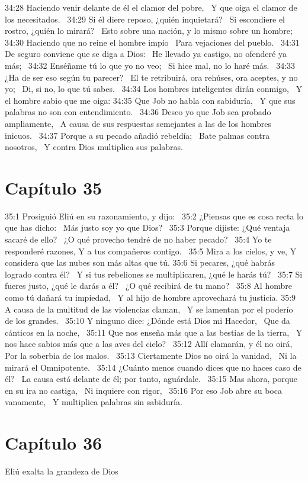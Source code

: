 34:28 Haciendo venir delante de él el clamor del pobre,  
Y que oiga el clamor de los necesitados.  
34:29 Si él diere reposo, ¿quién inquietará?  
Si escondiere el rostro, ¿quién lo mirará?  
Esto sobre una nación, y lo mismo sobre un hombre;  
34:30 Haciendo que no reine el hombre impío  
Para vejaciones del pueblo.  
34:31 De seguro conviene que se diga a Dios:  
He llevado ya castigo, no ofenderé ya más;  
34:32 Enséñame tú lo que yo no veo;  
Si hice mal, no lo haré más.  
34:33 ¿Ha de ser eso según tu parecer?  
El te retribuirá, ora rehúses, ora aceptes, y no yo;  
Di, si no, lo que tú sabes.  
34:34 Los hombres inteligentes dirán conmigo,  
Y el hombre sabio que me oiga: 
34:35 Que Job no habla con sabiduría,  
Y que sus palabras no son con entendimiento.  
34:36 Deseo yo que Job sea probado ampliamente,  
A causa de sus respuestas semejantes a las de los hombres inicuos.  
34:37 Porque a su pecado añadió rebeldía;  
Bate palmas contra nosotros,  
Y contra Dios multiplica sus palabras.  
\section*{Capítulo 35 }

35:1 Prosiguió Eliú en su razonamiento, y dijo:  
35:2 ¿Piensas que es cosa recta lo que has dicho:  
Más justo soy yo que Dios?  
35:3 Porque dijiste: ¿Qué ventaja sacaré de ello?  
¿O qué provecho tendré de no haber pecado?  
35:4 Yo te responderé razones, 
Y a tus compañeros contigo.  
35:5 Mira a los cielos, y ve, 
Y considera que las nubes son más altas que tú. 
35:6 Si pecares, ¿qué habrás logrado contra él?  
Y si tus rebeliones se multiplicaren, ¿qué le harás tú?  
35:7 Si fueres justo, ¿qué le darás a él?  
¿O qué recibirá de tu mano?  
35:8 Al hombre como tú dañará tu impiedad,  
Y al hijo de hombre aprovechará tu justicia. 
35:9 A causa de la multitud de las violencias claman,  
Y se lamentan por el poderío de los grandes.  
35:10 Y ninguno dice: ¿Dónde está Dios mi Hacedor,  
Que da cánticos en la noche,  
35:11 Que nos enseña más que a las bestias de la tierra,  
Y nos hace sabios más que a las aves del cielo?  
35:12 Allí clamarán, y él no oirá,  
Por la soberbia de los malos.  
35:13 Ciertamente Dios no oirá la vanidad,  
Ni la mirará el Omnipotente.  
35:14 ¿Cuánto menos cuando dices que no haces caso de él?  
La causa está delante de él; por tanto, aguárdale.  
35:15 Mas ahora, porque en su ira no castiga,  
Ni inquiere con rigor,  
35:16 Por eso Job abre su boca vanamente,  
Y multiplica palabras sin sabiduría.  
\section*{Capítulo 36}
Eliú exalta la grandeza de Dios  

